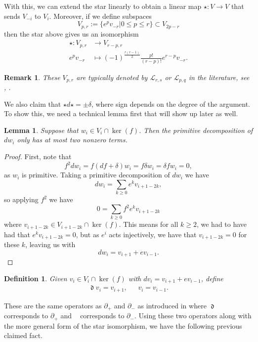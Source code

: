 \documentclass{amsart}
\newcommand{\p}{\partial}
\newcommand{\ra}{\rightarrow}
\newtheorem{lemma}[theorem]{Lemma}
\newtheorem{definition}[theorem]{Definition}
\newtheorem{remark}[theorem]{Remark}
\DeclareMathOperator{\dee}{\mathfrak{d}}
\DeclareMathOperator{\deebar}{\overline{\mathfrak{d}}}
\theoremstyle{definition}
\begin{document}
With this, we can extend the star linearly to obtain a linear map $\star:V \ra V$ that sends $V_{-i}$ to $V_i$. Moreover, if we define subspaces
\begin{equation*}
    V_{p,r}:= \{e^pv_{-r}| 0 \leq p \leq r \} \subset V_{2p-r}
\end{equation*}
then the star above gives us an isomorphism
\begin{align*}
    \star:V_{p,r} &\ra V_{r-p,r} \\
    e^pv_{-r} &\mapsto (-1)^{\frac{r(r-1)}{2}} \frac{p!}{(r-p)!}e^{r-p}v_{-r}.
\end{align*}
\begin{remark}
    These $V_{p,r}$ are typically denoted by $\mathcal{L}_{r,s}$ or $\mathcal{L}_{p,q}$ in the literature, see \cite{tseng2012cohomologyhodgetheorysymplectic}, \cite{HoSym}.
\end{remark}
We also claim that $\star d\star=\pm \delta$, where sign depends on the degree of the argument. To show this, we need a technical lemma first that will show up later as well.
\begin{lemma}
    Suppose that $w_i \in V_i \cap \ker(f)$. Then the primitive decomposition of $dw_i$ only has at most two nonzero terms.
\end{lemma}
\begin{proof}
    First, note that 
    \begin{equation*}
        f^2dw_i = f(df+\delta)w_i = f\delta w_i = \delta f w_i =0,
    \end{equation*}
    as $w_i$ is primitive. Taking a primitive decomposition of $dw_i$ we have
    \begin{equation*}
        dw_i = \sum_{k \geq 0}e^k v_{i+1-2k},
    \end{equation*}
    so applying $f^2$ we have
    \begin{equation*}
        0 = \sum_{k\geq 0} f^2 e^kv_{i+1-2k}
    \end{equation*}
    where $v_{i+1-2k}\in V_{i+1-2k}\cap \ker(f)$.
    This means for all $k \geq 2$, we had to have had that $e^kv_{i+1-2k}=0$, but as $e^i$ acts injectively, we have that $v_{i+1-2k}=0$ for these $k$, leaving us with
    \begin{equation*}
        dw_i = v_{i+1}+ev_{i-1}.
    \end{equation*}
\end{proof}
\begin{definition}
    Given $v_i \in V_i\cap \ker(f)$ with $dv_i = v_{i+1}+ev_{i-1}$, define
    \begin{align*}
        \dee v_i = v_{i+1}, \quad 
        \deebar  v_i = v_{i-1}.
    \end{align*}
\end{definition}
These are the same operators as $\p_+$ and $\p_-$ as introduced in \cite{tseng2012cohomologyhodgetheorysymplectic} where $\dee$ corresponds to $\p_+$ and $\deebar$ corresponds to $\p_-$. Using these two operators along with the more general form of the star isomorphism, we have the following previous claimed fact.
\end{document}
